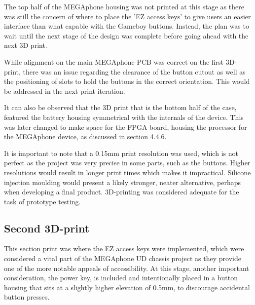 The top half of the MEGAphone housing was not printed at this stage as there was still the concern of where to place the 'EZ access keys' to give users an easier interface than what capable with the Gameboy buttons.
Instead, the plan was to wait until the next stage of the design was complete before going ahead with the next 3D print.

While alignment on the main MEGAphone PCB was correct on the first 3D-print, there was an issue regarding the clearance of the button cutout as well as the positioning of slots to hold the buttons in the correct orientation.
This would be addressed in the next print iteration.

It can also be observed that the 3D print that is the bottom half of the case, featured the battery housing symmetrical with the internals of the device.
This was later changed to make space for the FPGA board, housing the processor for the MEGAphone device, as discussed in section 4.4.6.

It is important to note that a 0.15mm print resolution was used, which is not perfect as the project was very precise in some parts, such as the buttons.
Higher resolutions would result in longer print times which makes it impractical.
Silicone injection moulding would present a likely stronger, neater alternative, perhaps when developing a final product.
3D-printing was considered adequate for the task of prototype testing.

\subsection{Second 3D-print}

This section print was where the EZ access keys were implemented, which were considered a vital part of the MEGAphone UD chassis project as they provide one of the more notable appeals of accessibility.
At this stage, another important consideration, the power key, is included and intentionally placed in a button housing that sits at a slightly higher elevation of 0.5mm, to discourage accidental button presses.

